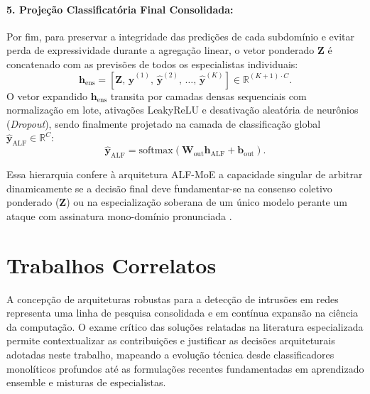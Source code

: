 \paragraph{5. Projeção Classificatória Final Consolidada:}
Por fim, para preservar a integridade das predições de cada subdomínio e evitar perda de expressividade durante a agregação linear, o vetor ponderado $\mathbf{Z}$ é concatenado com as previsões de todos os especialistas individuais:
\begin{equation}
\label{eq:alf_concat}
\mathbf{h}_{\mathrm{ens}} = \left[ \mathbf{Z}, \, \hat{\mathbf{y}}^{(1)}, \, \hat{\mathbf{y}}^{(2)}, \, \dots, \, \hat{\mathbf{y}}^{(K)} \right] \in \mathbb{R}^{(K+1) \cdot C}.
\end{equation}
O vetor expandido $\mathbf{h}_{\mathrm{ens}}$ transita por camadas densas sequenciais com normalização em lote, ativações LeakyReLU e desativação aleatória de neurônios (\emph{Dropout}), sendo finalmente projetado na camada de classificação global $\hat{\mathbf{y}}_{\mathrm{ALF}} \in \mathbb{R}^C$:
\begin{equation}
\label{eq:alf_final_softmax}
\hat{\mathbf{y}}_{\mathrm{ALF}} = \mathrm{softmax} \left( \mathbf{W}_{\mathrm{out}} \mathbf{h}_{\mathrm{ALF}} + \mathbf{b}_{\mathrm{out}} \right).
\end{equation}

Essa hierarquia confere à arquitetura ALF-MoE a capacidade singular de arbitrar dinamicamente se a decisão final deve fundamentar-se na consenso coletivo ponderado ($\mathbf{Z}$) ou na especialização soberana de um único modelo perante um ataque com assinatura mono-domínio pronunciada \cite{alfmoe2026}.

\section{Trabalhos Correlatos}
\label{sec:trabalhos_correlatos}

A concepção de arquiteturas robustas para a detecção de intrusões em redes representa uma linha de pesquisa consolidada e em contínua expansão na ciência da computação. O exame crítico das soluções relatadas na literatura especializada permite contextualizar as contribuições e justificar as decisões arquiteturais adotadas neste trabalho, mapeando a evolução técnica desde classificadores monolíticos profundos até as formulações recentes fundamentadas em aprendizado ensemble e misturas de especialistas.


